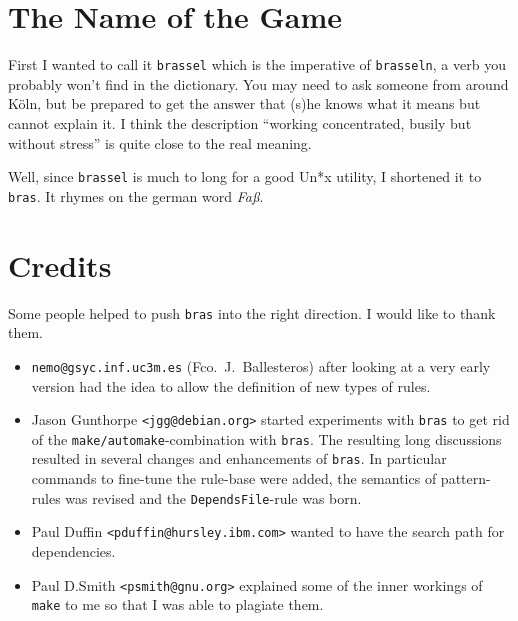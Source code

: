 \documentclass[11pt]{scrartcl}
\newcommand{\bras}{\texttt{bras}}
\newcommand{\make}{\texttt{make}}
\begin{document}
\section{The Name of the Game}

First I wanted to call it \texttt{brassel} which is the imperative of
\texttt{brasseln}, a verb you probably won't find in the
dictionary. You may need to ask someone from around K\"oln, but be
prepared to get the answer that (s)he knows what it means but cannot
explain it. I think the description "`working concentrated, busily but
without stress"' is quite close to the real meaning.

Well, since \texttt{brassel} is much to long for a good
Un*x utility, I shortened it to \bras. It rhymes on the german word
\textit{Fa\ss}.

\section{Credits}

Some people helped to push \bras{} into the right direction. I
would like to thank them. 

\begin{itemize}
\item \texttt{nemo@gsyc.inf.uc3m.es} (Fco.\ J.~Ballesteros) after
looking at a very early version had the
idea to allow the definition of new types of rules.

\item Jason Gunthorpe \texttt{<jgg@debian.org>} started experiments
  with \bras{} to get rid of the \texttt{make/automake}-combination
  with \bras{}. The resulting long discussions resulted in several
  changes and enhancements of \bras{}. In particular commands to
  fine-tune the rule-base were added, the semantics of pattern-rules
  was revised and the \texttt{DependsFile}-rule was born.
  
\item Paul Duffin \texttt{<pduffin@hursley.ibm.com>} wanted to have
  the search path for dependencies.
  
\item Paul D.Smith \texttt{<psmith@gnu.org>} explained some of the
  inner workings of \make{} to me so that I was able to plagiate them.
\end{itemize}

\clearpage
\appendix
\end{document}
